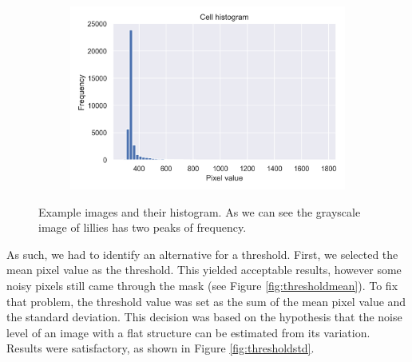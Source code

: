 \begin{figure}[h]
\begin{subfigure}{0.5\textwidth}
        \centering
        \includegraphics[width=.45\textwidth]{dissertation/figures/cell_histogram.png}
    \end{subfigure}
    \caption{Example images and their histogram. As we can see the grayscale image of lillies has two peaks of frequency.}
    \label{fig:thresholdhist}
\end{figure}
As such, we had to identify an alternative for a threshold. First, we selected the mean pixel value as the threshold. This yielded acceptable results, however some noisy pixels still came through the mask (see Figure \ref{fig:thresholdmean}). To fix that problem, the threshold value was set as the sum of the mean pixel value and the standard deviation. This decision was based on the hypothesis that the noise level of an image with a flat structure can be estimated from its variation. Results were satisfactory, as shown in Figure \ref{fig:thresholdstd}.

